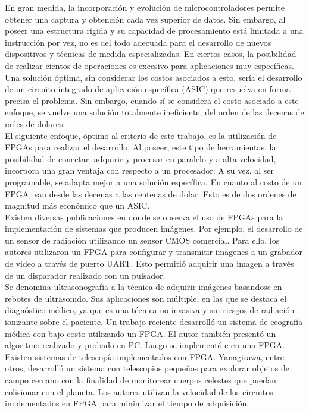 En gran medida, la incorporación y evolución de microcontroladores permite obtener una captura y obtención cada vez superior de datos. Sin embargo, al poseer una estructura rígida y su capacidad de procesamiento está limitada a una instrucción por vez, no es del todo adecuada para el desarrollo de nuevos dispositivos y técnicas de medida especializadas. En ciertos casos, la posibilidad de realizar cientos de operaciones es excesivo para aplicaciones muy específicas. Una solución óptima, sin considerar los costos asociados a esto, sería el desarrollo de un circuito integrado de aplicación específica (ASIC) que resuelva en forma precisa el problema. Sin embargo, cuando sí se considera el costo asociado a este enfoque, se vuelve una solución totalmente ineficiente, del orden de las decenas de miles de dolares.\\

El siguiente enfoque, óptimo al criterio de este trabajo, es la utilización de FPGAs para realizar el desarrollo. Al poseer, este tipo de herramientas, la posibilidad de conectar, adquirir y procesar en paralelo y a alta velocidad, incorpora una gran ventaja con respecto a un procesador. A su vez, al ser programable, se adapta mejor a una solución específica. En cuanto al costo de un FPGA, van desde las decenas a las centenas de dolar. Esto es de dos ordenes de magnitud más económico que un ASIC.\\

Existen diversas publicaciones en donde se observa el uso de FPGAs para la implementación de sistemas que producen imágenes. Por ejemplo, el desarrollo de un sensor de radiación utilizando un sensor CMOS comercial. Para ello, los autores utilizaron un FPGA para configurar y transmitir imagenes a un grabador de video a través de puerto UART. Esto permitió adquirir una imagen a través de un disparador realizado con un pulsador\cite{Perez2017}.\\

Se denomina ultrasonografía a la técnica de adquirir imágenes basandose en rebotes de ultrasonido. Sus aplicaciones son múltiple, en las que se destaca el diagnóstico médico, ya que es una técnica no invasiva y sin riesgos de radiación ionizante sobre el paciente. Un trabajo reciente desarrolló un sistema de ecografía médica con bajo costo utilizando un FPGA\cite{biswas2018embedded}. El autor también presentó un algoritmo realizado y probado en PC. Luego se implementó e en una FPGA.\\

Existen sistemas de telescopía implementados con FPGA. Yanagisawa, entre otros, desarrolló un sistema con telescopios pequeños para explorar objetos de campo cercano con la finalidad de monitorear cuerpos celestes que puedan colisionar con el planeta\cite{Yanagisawa2018}. Los autores utilizan la velocidad de los circuitos implementados en FPGA para minimizar el tiempo de adquisición.

